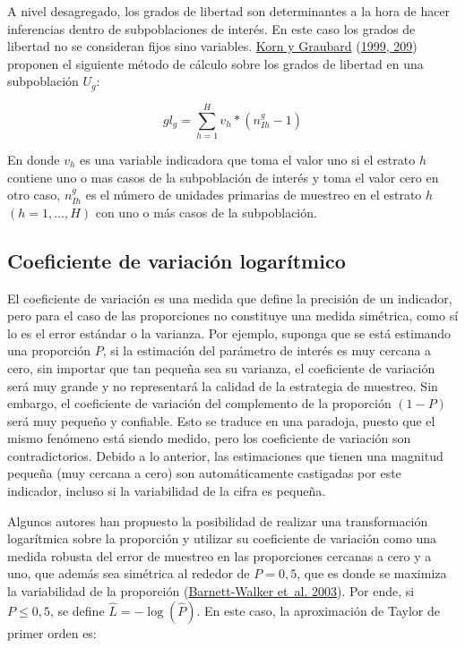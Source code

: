 \documentclass[
  12pt,
  spanish,
]{book}
\begin{document}
A nivel desagregado, los grados de libertad son determinantes a la hora de hacer inferencias dentro de subpoblaciones de interés. En este caso los grados de libertad no se consideran fijos sino variables. \protect\hyperlink{ref-Korn_Graubard_1999}{Korn y Graubard} (\protect\hyperlink{ref-Korn_Graubard_1999}{1999, 209}) proponen el siguiente método de cálculo sobre los grados de libertad en una subpoblación \(U_g\):

\[
gl_{g} = \sum_{h=1}^H v_h*(n_{Ih}^g - 1)
\]

En donde \(v_h\) es una variable indicadora que toma el valor uno si el estrato \(h\) contiene uno o mas casos de la subpoblación de interés y toma el valor cero en otro caso, \(n_{Ih}^g\) es el número de unidades primarias de muestreo en el estrato \(h\) \((h=1, \ldots, H)\) con uno o más casos de la subpoblación.

\hypertarget{coeficiente-de-variaciuxf3n-logaruxedtmico}{%
\subsection{Coeficiente de variación logarítmico}\label{coeficiente-de-variaciuxf3n-logaruxedtmico}}

El coeficiente de variación es una medida que define la precisión de un indicador, pero para el caso de las proporciones no constituye una medida simétrica, como sí lo es el error estándar o la varianza. Por ejemplo, suponga que se está estimando una proporción \(P\), si la estimación del parámetro de interés es muy cercana a cero, sin importar que tan pequeña sea su varianza, el coeficiente de variación será muy grande y no representará la calidad de la estrategia de muestreo. Sin embargo, el coeficiente de variación del complemento de la proporción \((1-P)\) será muy pequeño y confiable. Esto se traduce en una paradoja, puesto que el mismo fenómeno está siendo medido, pero los coeficiente de variación son contradictorios. Debido a lo anterior, las estimaciones que tienen una magnitud pequeña (muy cercana a cero) son automáticamente castigadas por este indicador, incluso si la variabilidad de la cifra es pequeña.

Algunos autores han propuesto la posibilidad de realizar una transformación logarítmica sobre la proporción y utilizar su coeficiente de variación como una medida robusta del error de muestreo en las proporciones cercanas a cero y a uno, que además sea simétrica al rededor de \(P=0,5\), que es donde se maximiza la variabilidad de la proporción (\protect\hyperlink{ref-Barnett_Walker_Chromy_Davis_Emrich_Odom_Packer_2003}{Barnett-Walker et~al. 2003}). Por ende, si \(P\leq 0,5\), se define \(\hat L = -\log( \hat P)\). En este caso, la aproximación de Taylor de primer orden es:
\end{document}
